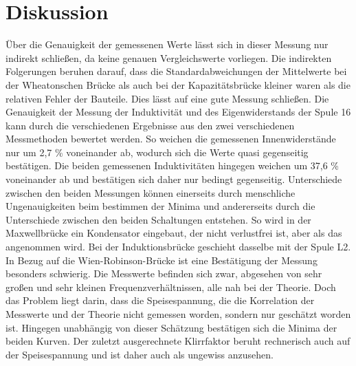 \documentclass[titlepage = firstcover]{scrartcl}
\begin{document}
\section{Diskussion}
  Über die Genauigkeit der gemessenen Werte lässt sich in dieser Messung nur indirekt schließen, da keine genauen Vergleichswerte vorliegen. Die indirekten 
  Folgerungen beruhen darauf, dass die Standardabweichungen der Mittelwerte bei der Wheatonschen Brücke als auch bei der Kapazitätsbrücke kleiner waren als 
  die relativen Fehler der Bauteile. Dies lässt auf eine gute Messung schließen. Die Genauigkeit der Messung der Induktivität und des Eigenwiderstands der 
  Spule 16 kann durch die verschiedenen Ergebnisse aus den zwei verschiedenen Messmethoden bewertet werden. So weichen die gemessenen Innenwiderstände nur um
  2,7 \% voneinander ab, wodurch sich die Werte quasi gegenseitig bestätigen. Die beiden gemessenen Induktivitäten hingegen weichen um 37,6 \% voneinander ab
  und bestätigen sich daher nur bedingt gegenseitig. Unterschiede zwischen den beiden Messungen können einerseits durch menschliche Ungenauigkeiten beim 
  bestimmen der Minima und andererseits durch die Unterschiede zwischen den beiden Schaltungen entstehen. So wird in der Maxwellbrücke ein Kondensator 
  eingebaut, der nicht verlustfrei ist, aber als das angenommen wird. Bei der Induktionsbrücke geschieht dasselbe mit der Spule L2. In Bezug auf die 
  Wien-Robinson-Brücke ist eine Bestätigung der Messung besonders schwierig. Die Messwerte befinden sich zwar, abgesehen von sehr großen und sehr kleinen 
  Frequenzverhältnissen, alle nah bei der Theorie. Doch das Problem liegt darin, dass die Speisespannung, die die Korrelation der Messwerte und der Theorie
  nicht gemessen worden, sondern nur geschätzt worden ist. Hingegen unabhängig von dieser Schätzung bestätigen sich die Minima der beiden Kurven. Der zuletzt
  ausgerechnete Klirrfaktor beruht rechnerisch auch auf der Speisespannung und ist daher auch als ungewiss anzusehen. 
  
\end{document}
